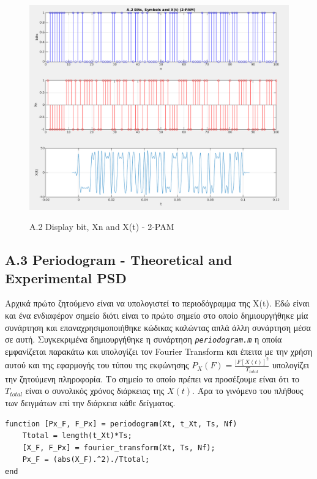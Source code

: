 \documentclass[11pt]{article}
\begin{document}
    \begin{figure}[H]
        \centering
        \includegraphics[scale=0.5, width=\textwidth]{photos/A.2 Bits_symbols_Xt_2-PAM.png} \\
        \caption{A.2 Display bit, Xn and X(t) - 2-PAM}
    \end{figure}
    
    
    \subsection*{A.3 Periodogram - Theoretical and Experimental PSD}
    Αρχικά πρώτο ζητούμενο είναι να υπολογιστεί το περιοδόγραμμα της X(t). 
    Εδώ είναι και ένα ενδιαφέρον σημείο διότι είναι το πρώτο σημείο στο οποίο δημιουργήθηκε μία συνάρτηση και επαναχρησιμοποιήθηκε κώδικας καλώντας απλά άλλη συνάρτηση μέσα σε αυτή. 
    Συγκεκριμένα δημιουργήθηκε η συνάρτηση \emph{\texttt{periodogram.m}} η οποία εμφανίζεται παρακάτω και υπολογίζει τον Fourier Transform και έπειτα με την χρήση αυτού και της εφαρμογής του τύπου της εκφώνησης $P_X(F) = \frac{|F[X(t)]^2}{T_{total}}$ υπολογίζει την ζητούμενη πληροφορία. 
    Το σημείο το οποίο πρέπει να προσέξουμε είναι ότι το $T_{total}$  είναι ο συνολικός χρόνος διάρκειας της $X(t)$. 
    Άρα το γινόμενο του πλήθους των δειγμάτων επί την διάρκεια κάθε δείγματος.
    
    \begin{lstlisting}[caption = {periodogram.m}]
function [Px_F, F_Px] = periodogram(Xt, t_Xt, Ts, Nf)
    Ttotal = length(t_Xt)*Ts;
    [X_F, F_Px] = fourier_transform(Xt, Ts, Nf);
    Px_F = (abs(X_F).^2)./Ttotal;
end
    \end{lstlisting}
\end{document}
